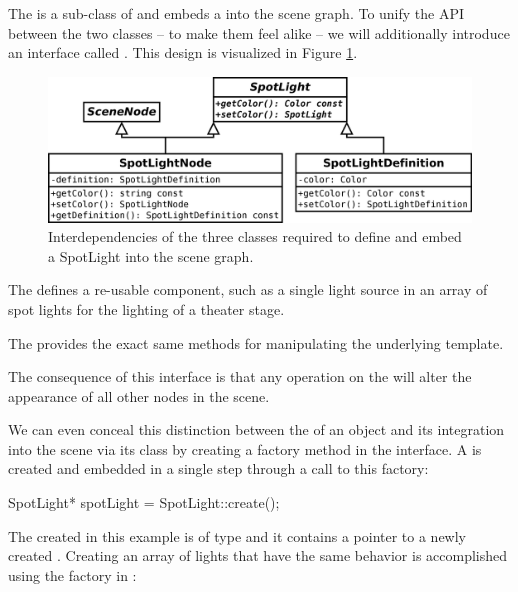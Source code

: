 	The  is a sub-class of  and embeds a  into the scene graph. To unify the API between the two classes -- to make them feel alike -- we will additionally introduce an interface called . This design is visualized in Figure \ref{fig:NodeArchitecture}.

	\begin{figure}[htbp]
		\centering
		\includegraphics[width=14cm]{images/NodeArchitecture.png}
		\caption{Interdependencies of the three classes required to define and embed a SpotLight into the scene graph.}
		\label{fig:NodeArchitecture}
	\end{figure}

	\begin{smalllist}
		\item The  defines a re-usable component, such as a single light source in an array of spot lights for the lighting of a theater stage.
		\item The  provides the exact same methods for manipulating the underlying template.
		\item The consequence of this interface is that any operation on the  will alter the appearance of all other nodes in the scene.
	\end{smalllist}

	We can even conceal this distinction between the  of an object and its integration into the scene via its  class by creating a factory method in the interface. A  is created and embedded in a single step through a call to this factory:

	\begin{code}[2]
		SpotLight* spotLight = SpotLight::create();
	\end{code}

	The  created in this example is of type  and it contains a pointer to a newly created . Creating an array of lights that have the same behavior is accomplished using the factory in :

